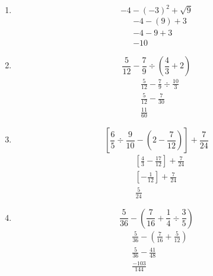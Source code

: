 \documentclass[12pt,letterpaper]{report}
\begin{document}
\begin{enumerate}
\begin{equation*}
        6(-1)^3-4
    \end{equation*}
    \begin{align*}
        &6(-1)-4\\
        &-6-4\\
        &-10
    \end{align*}
    \item \begin{equation*}
        -4-(-3)^2+\sqrt{9}
    \end{equation*}
    \begin{align*}
        &-4-(9)+3\\
        &-4-9+3\\
        &-10
    \end{align*}
    \item \begin{equation*}
    \frac{5}{12}- \frac{7}{9} \div (\frac{4}{3}+2)
    \end{equation*}
    \begin{align*}
        &\frac{5}{12}-\frac{7}{9} \div \frac{10}{3}\\
        &\frac{5}{12}-\frac{7}{30}\\
        &\frac{11}{60}
    \end{align*}
    \item \begin{equation*}
        \left[\frac{6}{5}\div \frac{9}{10}-\left(  2-\frac{7}{12}\right) \right] +\frac{7}{24}
    \end{equation*}
    \begin{align*}
        &\left[\frac{4}{3}-\frac{17}{12} \right]+\frac{7}{24}\\
        &\left[ -\frac{1}{12}\right]+\frac{7}{24}\\
        &\frac{5}{24}
    \end{align*}
    \item \begin{equation*}
     \frac{5}{36}-\left(  \frac{7}{16}+\frac{1}{4}\div \frac{3}{5}\right)
    \end{equation*}
    \begin{align*}
        &\frac{5}{36}-\left( \frac{7}{16}+\frac{5}{12}\right)\\
        &\frac{5}{36}- \frac{41}{48}\\
        &\frac{-103}{144}
    \end{align*}
\end{enumerate}
\end{document}
